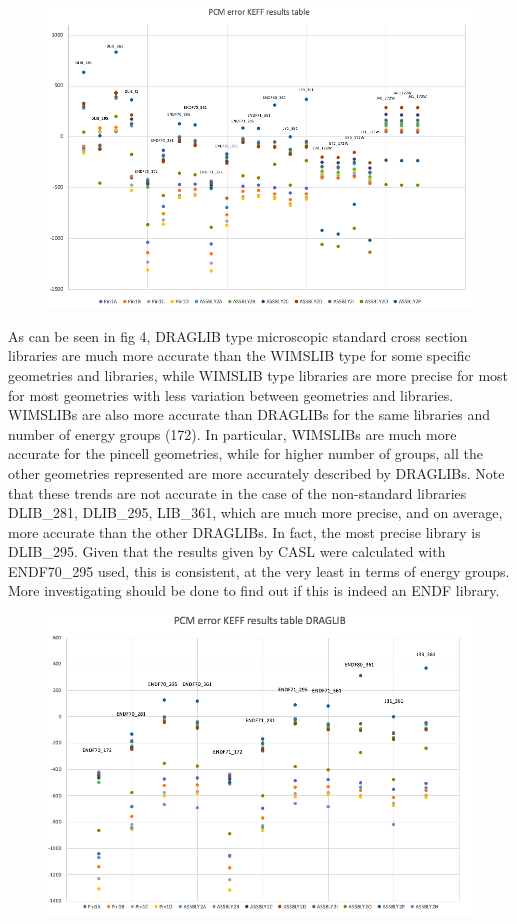 \documentclass[12pt]{article}
\begin{document}
\begin{figure} [htb!]
\centering
\includegraphics[scale=0.6]{Figures/allData-outliers2.png}
\caption{}
\end{figure}

As can be seen in fig 4, DRAGLIB type microscopic standard cross section libraries are much more accurate than the WIMSLIB type for some specific geometries and libraries, while WIMSLIB type libraries are more precise for most for most geometries with less variation between geometries and libraries. WIMSLIBs are also more accurate than DRAGLIBs for the same libraries and number of energy groups (172). In particular, WIMSLIBs are much more accurate for the pincell geometries, while for higher number of groups, all the other geometries represented are more accurately described by DRAGLIBs. Note that these trends are not accurate in the case of the non-standard libraries DLIB\_281, DLIB\_295, LIB\_361, which are much more precise, and on average, more accurate than the other DRAGLIBs. In fact, the most precise library is DLIB\_295. Given that the results given by CASL were calculated with ENDF70\_295 used, this is consistent, at the very least in terms of energy groups. More investigating should be done to find out if this is indeed an ENDF library.

\begin{figure} [htb!]
\centering
\includegraphics[scale=0.6]{Figures/DRAGLIB-DLIB2.png}
\caption{}
\end{figure}
\end{document}
